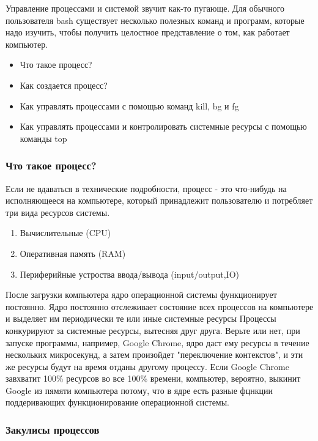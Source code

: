 \documentclass{article}
\begin{document}
Управление процессами и системой звучит как-то пугающе. Для обычного
пользователя bash существует несколько полезных команд и программ,
которые надо изучить, чтобы получить целостное представление о том, как
работает компьютер.

\begin{itemize}
\tightlist
\item
  Что такое процесс?
\item
  Как создается процесс?
\item
  Как управлять процессами с помощью команд kill, bg и fg
\item
  Как управлять процессами и контролировать системные ресурсы с помощью
  команды top
\end{itemize}

\hypertarget{What-is-a-Process}{%
\subsubsection{\texorpdfstring{\protect\hyperlink{What-is-a-Process}{}Что
такое процесс?}{Что такое процесс?}}\label{What-is-a-Process}}

Если не вдаваться в технические подробности, процесс - это что-нибудь на
исполняющееся на компьютере, который принадлежит пользователю и
потребляет три вида ресурсов системы.

\begin{enumerate}
\tightlist
\item
  Вычислительные (CPU)
\item
  Оперативная память (RAM)
\item
  Периферийные устроства ввода/вывода (input/output,IO)
\end{enumerate}

После загрузки компьютера ядро операционной системы функционирует
постоянно. Ядро постоянно отслеживает состояние всех процессов на
компьютере и выделяет им периодически те или иные системные ресурсы
Процессы конкурируют за системные ресурсы, вытесняя друг друга. Верьте
или нет, при запуске программы, например, Google Chrome, ядро даст ему
ресурсы в течение нескольких микросекунд, а затем произойдет
"переключение контекстов", и эти же ресурсы будут на время отданы
другому процессу. Если Google Chrome завхватит 100\% ресурсов во все
100\% времени, компьютер, вероятно, выкинит Google из пямяти компьютера
потому, что в ядре есть разные фцнкции поддеривающих функционирование
операционной системы.

\hypertarget{Processes-Behind-the-Scenes}{%
\subsubsection{\texorpdfstring{\protect\hyperlink{Processes-Behind-the-Scenes}{}Закулисы
процессов}{Закулисы процессов}}\label{Processes-Behind-the-Scenes}}
\end{document}
